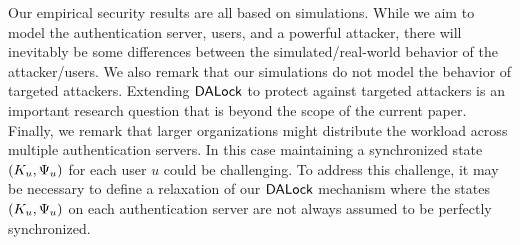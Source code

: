 \label{sec: Limitations}
Our empirical security results are all based on simulations. While we aim to model the authentication server, users, and a powerful attacker, there will inevitably be some differences between the simulated/real-world behavior of the attacker/users. We also remark that our simulations do not model the behavior of targeted attackers. Extending $\mathsf{DALock}$ to protect against targeted attackers is an important research question that is beyond the scope of the current paper. Finally, we remark that larger organizations might distribute the workload across multiple authentication servers. In this case maintaining a synchronized state $(K_{u}, \Psi_{u})$ for each user $u$ could be challenging. To address this challenge, it may be necessary to define a relaxation of our $\mathsf{DALock}$ mechanism where the states $(K_{u}, \Psi_{u})$ on each authentication server are not always assumed to be perfectly synchronized. 





